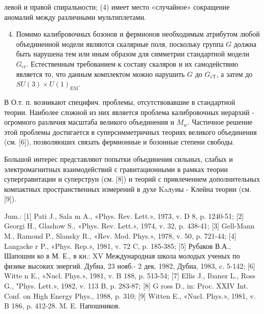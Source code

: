 \documentclass[10pt]{article}
\begin{document}
левой и правой спиральности; (4) имеет место «случайное» сокращение аномалий между различными мультиплетами.



\begin{enumerate}

  \setcounter{enumi}{3}

  \item Помимо калибровочных бозонов и фермионов необходимым атрибутом любой объединенной модели являются скалярные поля, поскольку группа $G$ должна быть нарушена тем или иным образом для симметрии стандартной модели $G_{\mathrm{cr}}$. Естественным требованием к составу скаляров и их самодействию является то, что данным комплектом можно нарушить $G$ до $G_{\mathrm{cT}}$, а затем до $S U(3) \times U(1)_{\mathrm{EM}}$.

\end{enumerate}



В О.т. п. возникают специфич. проблемы, отсутствовавшие в стандартной теории. Наиболее сложной из них является проблема калибровочных иерархий - огромного различия масштаба великого объединения и $M_{w}$. Частичное решение этой проблемы достигается в суперсимметричных теориях великого объединения (см. [6]), позволяюших связать фермионные и бозонные степени свободы.



Большой интерес представляют попытки объединения сильных, слабых и электромагнитных взаимодействий с гравитационными в рамках теории супергравитации и суперструн (см. [8]) и теорий с привлечением дополнительных компактных пространственных измерений в духе Kaлyиы - Клейна теории (см. [9]).



Jum.: [1] Pati J., Sala m A., «Phys. Rev. Lett.», 1973, v. D 8, p. 1240-51; [2] Georgi H., Glashow S., «Phys. Rev. Lett.», 1974, v. 32, p. 438-41; [3] Gell-Mann M., Ramond P., Slansky R., «Rev. Mod. Phys.», 1978, v. 50, p. 721-44; [4] Langacke r P., «Phys. Rep.», 1981, v. 72 C, p. 185-385; [5] Рубаков В.А., Шапошни ко в М. Е., в кн.: XV Международная школа молодых ученых по физике высоких энергий. Дубна, 23 нояб.- 2 дек. 1982, Дубна, 1983, c. 5-142; [6] Witte n E., «Nucl. Phys.», 1981, v. B 188, p. 513-54; [7] Ellis J., Ibanez L., Ross G., "Phys. Lett.», 1982, v. 113 B, p. 283-87; [8] G ross D., in: Proc. XXIV Int. Conf. on High Energy Phys., 1988, p. 310; [9] Witten E., «Nucl. Phys.», 1981, v. B 186, p. 412-28. M. E. Hапошников.
\end{document}
